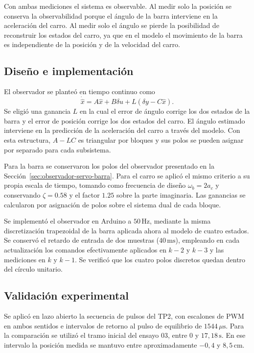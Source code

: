 \documentclass[a4paper, twoside, 10pt, spanish]{article}
\numberwithin{table}{section}
\begin{document}
Con ambas mediciones el sistema es observable. Al medir solo la posición se conserva la observabilidad porque el ángulo de la barra interviene en la aceleración del carro. Al medir solo el ángulo se pierde la posibilidad de reconstruir los estados del carro, ya que en el modelo el movimiento de la barra es independiente de la posición y de la velocidad del carro.

\subsection{Diseño e implementación}

El observador se planteó en tiempo continuo como
\begin{equation}
    \dot{\hat{x}} = A\hat{x} + B\delta u + L(\delta y - C\hat{x}).
\end{equation}
Se eligió una ganancia $L$ en la cual el error de ángulo corrige los dos estados de la barra y el error de posición corrige los dos estados del carro. El ángulo estimado interviene en la predicción de la aceleración del carro a través del modelo. Con esta estructura, $A-LC$ es triangular por bloques y sus polos se pueden asignar por separado para cada subsistema.

Para la barra se conservaron los polos del observador presentado en la Sección~\ref{sec:observador-servo-barra}. Para el carro se aplicó el mismo criterio a su propia escala de tiempo, tomando como frecuencia de diseño $\omega_b = 2a_c$ y conservando $\zeta=0.58$ y el factor $1.25$ sobre la parte imaginaria. Las ganancias se calcularon por asignación de polos sobre el sistema dual de cada bloque.

Se implementó el observador en Arduino a $50\,\mathrm{Hz}$, mediante la misma discretización trapezoidal de la barra aplicada ahora al modelo de cuatro estados. Se conservó el retardo de entrada de dos muestras ($40\,\mathrm{ms}$), empleando en cada actualización los comandos efectivamente aplicados en $k-2$ y $k-3$ y las mediciones en $k$ y $k-1$. Se verificó que los cuatro polos discretos quedan dentro del círculo unitario.

\subsection{Validación experimental}

Se aplicó en lazo abierto la secuencia de pulsos del TP2, con escalones de PWM en ambos sentidos e intervalos de retorno al pulso de equilibrio de $1544\,\mu\mathrm{s}$. Para la comparación se utilizó el tramo inicial del ensayo 03, entre $0$ y $17{,}18\,\mathrm{s}$. En ese intervalo la posición medida se mantuvo entre aproximadamente $-0{,}4$ y $8{,}5\,\mathrm{cm}$.
\end{document}
